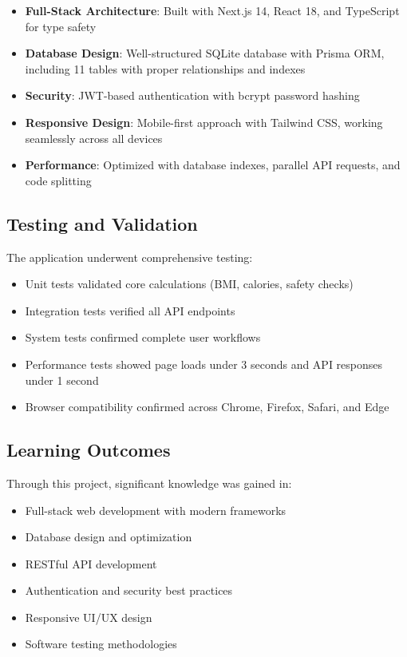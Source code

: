 \begin{itemize}
    \item \textbf{Full-Stack Architecture}: Built with Next.js 14, React 18, and TypeScript for type safety
    \item \textbf{Database Design}: Well-structured SQLite database with Prisma ORM, including 11 tables with proper relationships and indexes
    \item \textbf{Security}: JWT-based authentication with bcrypt password hashing
    \item \textbf{Responsive Design}: Mobile-first approach with Tailwind CSS, working seamlessly across all devices
    \item \textbf{Performance}: Optimized with database indexes, parallel API requests, and code splitting
\end{itemize}

\subsection{Testing and Validation}

The application underwent comprehensive testing:

\begin{itemize}
    \item Unit tests validated core calculations (BMI, calories, safety checks)
    \item Integration tests verified all API endpoints
    \item System tests confirmed complete user workflows
    \item Performance tests showed page loads under 3 seconds and API responses under 1 second
    \item Browser compatibility confirmed across Chrome, Firefox, Safari, and Edge
\end{itemize}

\subsection{Learning Outcomes}

Through this project, significant knowledge was gained in:

\begin{itemize}
    \item Full-stack web development with modern frameworks
    \item Database design and optimization
    \item RESTful API development
    \item Authentication and security best practices
    \item Responsive UI/UX design
    \item Software testing methodologies
\end{itemize}

